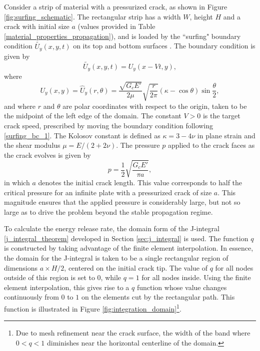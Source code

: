 
Consider a strip of material with a pressurized crack, as shown in  Figure \ref{fig:surfing_schematic}.
The rectangular strip has a width $W$, height $H$ and a crack with initial size $a$ (values provided in Table \ref{material_properties_propagation}), and is loaded by the ``surfing" boundary condition $\widetilde{U_y}(x,y,t)$ on its top and bottom surfaces \cite{hossain2014effective}. The boundary condition is given by
\begin{equation}\label{surfing_bc_1}
    \widetilde{U_y}(x,y,t) = U_y(x-Vt,y),  
\end{equation}
where
\begin{equation}\label{surfing_bc_2}
    U_y(x,y) = \hat{U}_y(r,\theta) = \dfrac{\sqrt{G_cE'}}{2\mu}\sqrt{\dfrac{r}{2\pi}}(\kappa - \cos\theta)\sin\dfrac{\theta}{2},
\end{equation}
and where $r$ and $\theta$ are polar coordinates with respect to the origin, taken to be the midpoint of the left edge of the domain. The constant $V>0$ is the target crack speed, prescribed by moving the boundary condition following \eqref{surfing_bc_1}. The Kolosov constant is defined as $\kappa = 3-4\nu$ in plane strain and the shear modulus $\mu = E/(2+2\nu)$. The pressure $p$ applied to the crack faces as the crack evolves is given by
\begin{equation}
    p = \dfrac{1}{2}\sqrt{\dfrac{G_cE'}{\pi a}},
\end{equation}
 in which $a$ denotes the initial crack length. This value corresponds to half the critical pressure for an infinite plate with a pressurized crack of size $a$. This magnitude ensures that the applied pressure is considerably large, but not so large as to drive the problem beyond the stable propagation regime. 
 
 To calculate the energy release rate, the domain form of the J-integral \eqref{j_integral_theorem} developed in Section \ref{sec:j_integral} is used. The function $q$ is constructed by taking advantage of the finite element interpolation. In essence, the domain for the J-integral is taken to be a single rectangular region of dimensions $a \times H/2$, centered on the initial crack tip. The value of $q$ for all nodes outside of this region is set to $0$, while $q = 1$ for all nodes inside. Using the finite element interpolation, this gives rise to a $q$ function whose value changes continuously from $0$ to $1$ on the elements cut by the rectangular path. This function is illustrated in Figure \ref{fig:integration_domain}\footnote{Due to mesh refinement near the crack surface, the width of the band where $0 < q < 1$ diminishes near the horizontal centerline of the domain.}.

